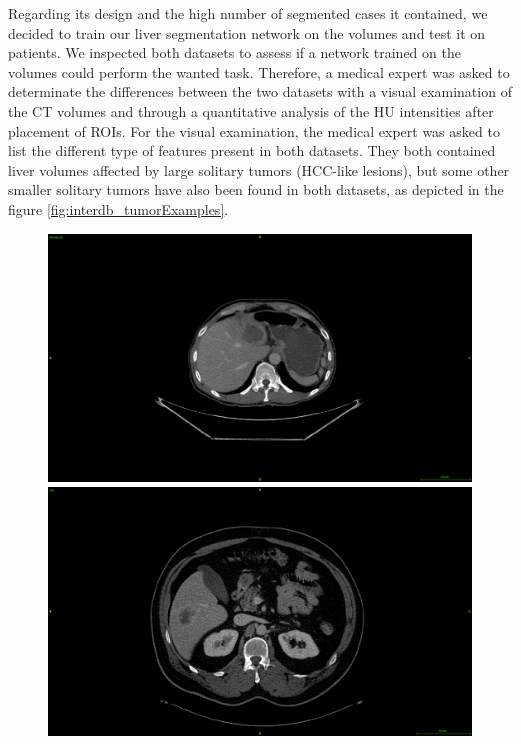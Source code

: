 {
Regarding its design and the high number of segmented cases it contained, we decided to train our liver segmentation network on the \textbf{} volumes and test it on \textbf{} patients.
We inspected both datasets to assess if a network trained on the \textbf{} volumes could perform the wanted task. Therefore, a medical expert was asked to determinate the differences between the two datasets with a visual examination of the CT volumes and through a quantitative analysis of the HU intensities after placement of ROIs.
For the visual examination, the medical expert was asked to list the different type of features present in both datasets.
They both contained liver volumes affected by large solitary tumors (HCC-like lesions), but some other smaller solitary tumors have also been found in both datasets, as depicted in the figure \ref{fig:interdb_tumorExamples}. 
\begin{figure}[!ht]
	\begin{mdframed}[backgroundcolor=blue!50,linecolor=blue!50]
		\centering
		\begin{minipage}{0.45\linewidth}
			\includegraphics[width=\linewidth]{images/LITS_examplePatientSmallTumor_2}
		\end{minipage} \hspace{-0.1cm}
		\begin{minipage}{0.45\linewidth}
			\includegraphics[width=\linewidth]{images/TCIA_examplePatientSmallTumor}

\end{minipage}
\end{mdframed}
\end{figure}}
